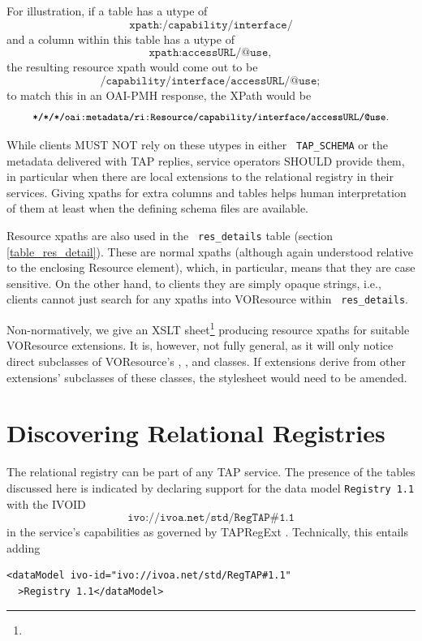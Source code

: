 \documentclass[11pt,a4paper]{ivoa}
\newcommand{\rtent}[1]{\texttt{\color{rtcolor} #1}}
\newcommand{\tapent}[1]{\texttt{\color{tapcolor} #1}}
\begin{document}
For illustration, if a table has a utype of
$$\texttt{xpath:/capability/interface/}$$ and a column within this table
has a utype of $$\texttt{xpath:accessURL/@use},$$ the resulting resource
xpath would come out to be
$$\texttt{/capability/interface/accessURL/@use};$$ to match this in an
OAI-PMH response, the XPath would be
$$\texttt{\small
*/*/*/oai:metadata/ri:Resource/capability/interface/accessURL/@use}.$$


While clients MUST NOT rely on these utypes in either
\tapent{TAP\_SCHEMA} or the
metadata delivered with TAP replies, service operators SHOULD provide them, in
particular when there are local extensions to the relational registry in their
services.  Giving xpaths for extra columns and tables helps human
interpretation of them at least when the defining schema files are
available.

Resource xpaths are also used in the \rtent{res\_details} table (section
\ref{table_res_detail}).  These are normal xpaths
(although again understood relative to the enclosing Resource element),
which, in particular, means that they are case sensitive.  On the other
hand, to clients they are simply opaque strings, i.e., clients cannot
just search for any xpaths into VOResource within \rtent{res\_details}.

Non-normatively, we give an XSLT
sheet\footnote{} producing resource xpaths
for suitable VOResource extensions. It is, however, not fully general, 
as it will only notice direct subclasses of VOResource's
, , and  classes.
If extensions derive from other extensions' subclasses of these classes,
the stylesheet would need to be amended.

\section{Discovering Relational Registries}

\label{registration}

The relational registry can be part of any TAP service.  The presence
of the tables discussed here is indicated by declaring support for the
data model \texttt{Registry 1.1} with the IVOID
$$\texttt{ivo://ivoa.net/std/RegTAP\#1.1}$$ in the service's
capabilities as governed by TAPRegExt \citep{std:TAPREGEXT}.  Technically, this
entails adding


\begin{verbatim}
<dataModel ivo-id="ivo://ivoa.net/std/RegTAP#1.1"
  >Registry 1.1</dataModel>
\end{verbatim}
\end{document}
